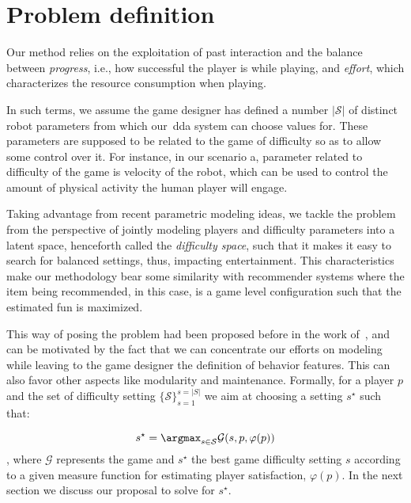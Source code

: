 \section{Problem definition}
Our method relies on the exploitation of past interaction and the balance between \textit{progress}, i.e., how successful the player is while playing, and \textit{effort}, which characterizes the resource consumption when playing. 

In such terms, we assume the game designer has defined a number $|\mathcal{S}|$ of distinct robot parameters from which our~\gls{dda} system can choose values for. These parameters are supposed to be related to the game of difficulty so as to allow some control over it. For instance, in our scenario a, parameter related to difficulty of the game is velocity of the robot, which can be used to control the amount of physical activity the human player will engage. 

Taking advantage from recent parametric modeling ideas, we tackle the problem from the perspective of jointly modeling players and difficulty parameters into a latent space, henceforth called the \textit{difficulty space}, such that it makes it easy to search for balanced settings, thus, impacting entertainment. This characteristics make our methodology bear some similarity with recommender systems where the item being recommended, in this case, is a game level configuration such that the estimated fun is maximized. 

This way of posing the problem had been proposed before in the work of~\cite{sejrsgaard-jacobsen_dynamic_2011}, and can be motivated by the fact that we can concentrate our efforts on modeling while leaving to the game designer the definition of behavior features. This can also favor other aspects like modularity and maintenance. Formally, for a player $p$ and the set of difficulty setting $\{\mathcal{S}\}^{s=|S|}_{s=1}$ we aim at choosing a setting $s^{\star}$ such that:

\begin{equation}
s^{\star} = \argmax_{s \in \mathcal{S}} \mathcal{G}(s,p, \varphi(p))
\end{equation}
, where $\mathcal{G}$ represents the game and $s^{\star}$ the best game difficulty setting $s$ according to a given measure function for estimating player satisfaction, $\varphi(p)$. In the next section we discuss our proposal to solve for $s^{\star}$.


